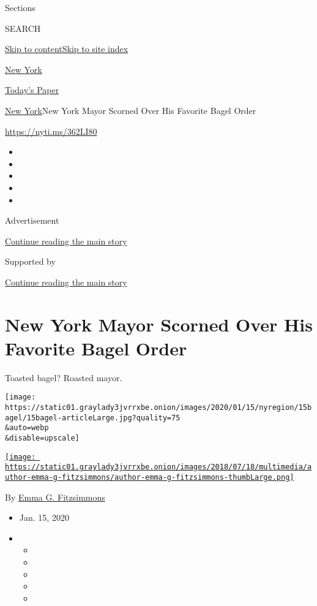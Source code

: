 Sections

SEARCH

\protect\hyperlink{site-content}{Skip to
content}\protect\hyperlink{site-index}{Skip to site index}

\href{https://www.nytimes3xbfgragh.onion/section/nyregion}{New York}

\href{https://myaccount.nytimes3xbfgragh.onion/auth/login?response_type=cookie\&client_id=vi}{}

\href{https://www.nytimes3xbfgragh.onion/section/todayspaper}{Today's
Paper}

\href{/section/nyregion}{New York}\textbar{}New York Mayor Scorned Over
His Favorite Bagel Order

\url{https://nyti.ms/362LI80}

\begin{itemize}
\item
\item
\item
\item
\item
\end{itemize}

Advertisement

\protect\hyperlink{after-top}{Continue reading the main story}

Supported by

\protect\hyperlink{after-sponsor}{Continue reading the main story}

\hypertarget{new-york-mayor-scorned-over-his-favorite-bagel-order}{%
\section{New York Mayor Scorned Over His Favorite Bagel
Order}\label{new-york-mayor-scorned-over-his-favorite-bagel-order}}

Toasted bagel? Roasted mayor.

\texttt{[image: https://static01.graylady3jvrrxbe.onion/images/2020/01/15/nyregion/15bagel/15bagel-articleLarge.jpg?quality=75\\\&auto=webp\\\&disable=upscale]}

\href{https://www.nytimes3xbfgragh.onion/by/emma-g-fitzsimmons}{\texttt{[image: https://static01.graylady3jvrrxbe.onion/images/2018/07/18/multimedia/author-emma-g-fitzsimmons/author-emma-g-fitzsimmons-thumbLarge.png]}}

By \href{https://www.nytimes3xbfgragh.onion/by/emma-g-fitzsimmons}{Emma
G. Fitzsimmons}

\begin{itemize}
\item
  Jan. 15, 2020
\item
  \begin{itemize}
  \item
  \item
  \item
  \item
  \item
  \end{itemize}
\end{itemize}

